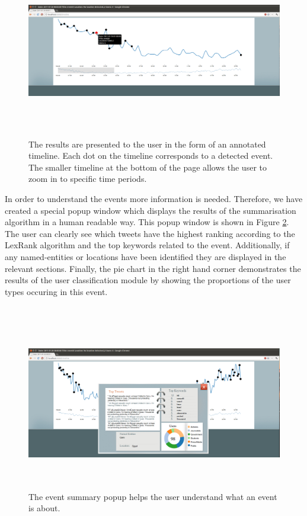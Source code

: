 \begin{figure}[htbp]
  \begin{center}
    \includegraphics[height=3in, width=6in]{pythia2}
    \caption{The results are presented to the user in the form of an annotated timeline. Each dot on the timeline corresponds to a detected event. The smaller timeline at the bottom of the page allows the    user to zoom in to specific time periods.}
    \label{Pythia2}
  \end{center}
\end{figure} 
In order to understand the events more information is needed. Therefore, we have created a special popup window which displays the results of the summarisation algorithm in a human readable way. This popup window is shown in Figure \ref{Pythia3}. The user can clearly see which tweets have the highest ranking according to the LexRank algorithm and the top keywords related to the event. Additionally, if any named-entities or locations have been identified they are displayed in the relevant sections. Finally, the pie chart in the right hand corner demonstrates the results of the user classification module by showing the proportions of the user types occuring in this event.\\\\    
\begin{figure}[htbp]
  \begin{center}
    \includegraphics[height=3in, width=6in]{pythia3}
    \caption{The event summary popup helps the user understand what an event is about.}
    \label{Pythia3}
  \end{center}
\end{figure} 

